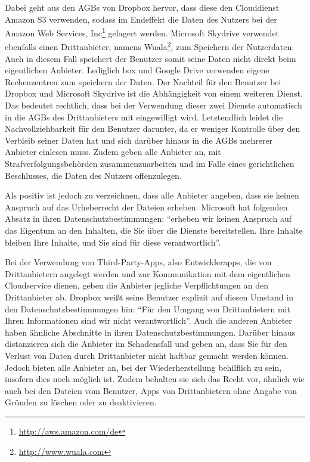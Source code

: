 Dabei geht aus den \acp{AGB} von Dropbox hervor, dass diese den Clouddienst Amazon S3 verwenden, sodass im Endeffekt die Daten des Nutzers bei der Amazon Web Services, Inc\footnote{\url{http://aws.amazon.com/de}} gelagert werden.
Microsoft Skydrive verwendet ebenfalls einen Drittanbieter, namens Wuala\footnote{\url{http://www.wuala.com}}, zum Speichern der Nutzerdaten.
Auch in diesem Fall speichert der Benutzer somit seine Daten nicht direkt beim eigentlichen Anbieter.
Lediglich box und Google Drive verwenden eigene Rechenzentren zum speichern der Daten\cite[vgl.][]{box-terms, goog11}.
Der Nachteil für den Benutzer bei Dropbox und Microsoft Skydrive ist die Abhängigkeit von einem weiteren Dienst.
Das bedeutet rechtlich, dass bei der Verwendung dieser zwei Dienste automatisch in die \acp{AGB} des Drittanbieters mit eingewilligt wird.
Letztendlich leidet die Nachvollziehbarkeit für den Benutzer darunter, da er weniger Kontrolle über den Verbleib seiner Daten hat und sich darüber hinaus in die \acp{AGB} mehrerer Anbieter einlesen muss.
Zudem geben alle Anbieter an, mit Strafverfolgungsbehörden zusammenzuarbeiten und im Falle eines gerichtlichen Beschlusses, die Daten des Nutzers offenzulegen\cite[vgl.][]{box-terms, drop12, goog11, skyd12}.

Als positiv ist jedoch zu verzeichnen, dass alle Anbieter angeben, dass sie keinen Anspruch auf das Urheberrecht der Dateien erheben\cite[vgl.][]{box-terms, drop12, goog11, skyd12}.
Microsoft hat folgenden Absatz in ihren Datenschutzbestimmungen: "`erheben wir keinen Anspruch auf das Eigentum an den Inhalten, die Sie über die Dienste bereitstellen. Ihre Inhalte bleiben Ihre Inhalte, und Sie sind für diese verantwortlich"'\cite{skyd12}.

Bei der Verwendung von Third-Party-\acp{App}, also Entwicklerapps, die von Drittanbietern angelegt werden und zur Kommunikation mit dem eigentlichen Cloudservice dienen, geben die Anbieter jegliche Verpflichtungen an den Drittanbieter ab.
Dropbox weißt seine Benutzer explizit auf diesen Umstand in den Datenschutzbestimmungen hin: "`Für den Umgang von Drittanbietern mit Ihren Informationen sind wir nicht verantwortlich"'\cite{drop13}.
Auch die anderen Anbieter haben ähnliche Abschnitte in ihren Datenschutzbestimmungen\cite[vgl.][]{box-terms, goog11, sky-dev}.
Darüber hinaus distanzieren sich die Anbieter im Schadensfall und geben an, dass Sie für den Verlust von Daten durch Drittanbieter nicht haftbar gemacht werden können\cite[vgl.][]{box-terms, drop13, goog11, sky-dev}.
Jedoch bieten alle Anbieter an, bei der Wiederherstellung behilflich zu sein, insofern dies noch möglich ist\cite[vgl.][]{box-terms, drop13, goog11, sky-dev}.
Zudem behalten sie sich das Recht vor, ähnlich wie auch bei den Dateien vom Benutzer, \acp{App} von Drittanbietern ohne Angabe von Gründen zu löschen oder zu deaktivieren\cite[vgl.][]{box-terms, drop13, goog11, sky-dev}.

